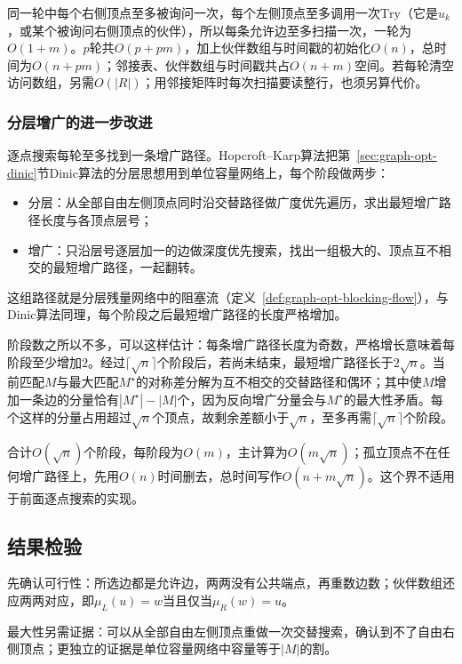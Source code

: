 同一轮中每个右侧顶点至多被询问一次，每个左侧顶点至多调用一次$\mathrm{Try}$（它是$u_k$，或某个被询问右侧顶点的伙伴），所以每条允许边至多扫描一次，一轮为$O(1+m)$。$p$轮共$O(p+pm)$，加上伙伴数组与时间戳的初始化$O(n)$，总时间为$O(n+pm)$；邻接表、伙伴数组与时间戳共占$O(n+m)$空间。若每轮清空访问数组，另需$O(|R|)$；用邻接矩阵时每次扫描要读整行，也须另算代价。

\subsubsection{分层增广的进一步改进}
\label{sec:graph-opt-hopcroft-karp}

逐点搜索每轮至多找到一条增广路径。Hopcroft--Karp算法把第~\ref{sec:graph-opt-dinic}节Dinic算法的分层思想用到单位容量网络上，每个阶段做两步：
\begin{itemize}
  \item 分层：从全部自由左侧顶点同时沿交替路径做广度优先遍历，求出最短增广路径长度与各顶点层号；
  \item 增广：只沿层号逐层加一的边做深度优先搜索，找出一组极大的、顶点互不相交的最短增广路径，一起翻转。
\end{itemize}
这组路径就是分层残量网络中的阻塞流（定义~\ref{def:graph-opt-blocking-flow}），与Dinic算法同理，每个阶段之后最短增广路径的长度严格增加。

阶段数之所以不多，可以这样估计：每条增广路径长度为奇数，严格增长意味着每阶段至少增加$2$。经过$\lceil\sqrt n\rceil$个阶段后，若尚未结束，最短增广路径长于$2\sqrt n$。当前匹配$M$与最大匹配$M^\star$的对称差分解为互不相交的交替路径和偶环；其中使$M$增加一条边的分量恰有$|M^\star|-|M|$个，因为反向增广分量会与$M^\star$的最大性矛盾。每个这样的分量占用超过$\sqrt n$个顶点，故剩余差额小于$\sqrt n$，至多再需$\lceil\sqrt n\rceil$个阶段。

合计$O(\sqrt n)$个阶段，每阶段为$O(m)$，主计算为$O(m\sqrt n)$；孤立顶点不在任何增广路径上，先用$O(n)$时间删去，总时间写作$O(n+m\sqrt n)$。这个界不适用于前面逐点搜索的实现。

\subsection{结果检验}
\label{sec:graph-opt-match-analysis}

先确认可行性：所选边都是允许边，两两没有公共端点，再重数边数；伙伴数组还应两两对应，即$\mu_L(u)=w$当且仅当$\mu_R(w)=u$。

最大性另需证据：可以从全部自由左侧顶点重做一次交替搜索，确认到不了自由右侧顶点；更独立的证据是单位容量网络中容量等于$|M|$的割。

